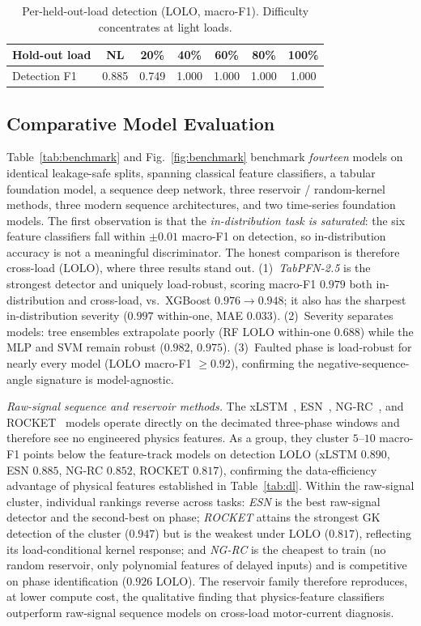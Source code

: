 \documentclass[journal]{IEEEtran}
\begin{document}
\begin{table}[!t]
\caption{Per-held-out-load detection (LOLO, macro-F1). Difficulty concentrates at light loads.}
\label{tab:perload}
\centering
\begin{tabular}{@{}lcccccc@{}}
\toprule
Hold-out load & NL & 20\% & 40\% & 60\% & 80\% & 100\% \\
\midrule
Detection F1 & 0.885 & 0.749 & 1.000 & 1.000 & 1.000 & 1.000 \\
\bottomrule
\end{tabular}
\end{table}

\subsection{Comparative Model Evaluation}
Table~\ref{tab:benchmark} and Fig.~\ref{fig:benchmark} benchmark \emph{fourteen} models on
identical leakage-safe splits, spanning classical feature classifiers, a tabular foundation
model, a sequence deep network, three reservoir / random-kernel methods, three modern
sequence architectures, and two time-series foundation models. The first observation is
that the \emph{in-distribution task is saturated}: the six feature classifiers fall within
$\pm0.01$ macro-F1 on detection, so in-distribution accuracy is not a meaningful
discriminator. The honest comparison is therefore cross-load (LOLO), where three results
stand out. (1)~\emph{TabPFN-2.5} is the strongest detector and uniquely load-robust,
scoring macro-F1 $0.979$ both in-distribution and cross-load, vs.\ XGBoost
$0.976\!\rightarrow\!0.948$; it also has the sharpest in-distribution severity ($0.997$
within-one, MAE $0.033$). (2)~Severity separates models: tree ensembles extrapolate
poorly (RF LOLO within-one $0.688$) while the MLP and SVM remain robust ($0.982$, $0.975$).
(3)~Faulted phase is load-robust for nearly every model (LOLO macro-F1 $\geq\!0.92$),
confirming the negative-sequence-angle signature is model-agnostic.

\emph{Raw-signal sequence and reservoir methods.} The xLSTM~\cite{beck2024}, ESN~\cite{jaeger2001},
NG-RC~\cite{gauthier2021}, and ROCKET~\cite{dempster2020} models operate directly on the
decimated three-phase windows and therefore see no engineered physics features. As a group,
they cluster $5$--$10$ macro-F1 points below the feature-track models on detection LOLO
(xLSTM $0.890$, ESN $0.885$, NG-RC $0.852$, ROCKET $0.817$), confirming the
data-efficiency advantage of physical features established in Table~\ref{tab:dl}. Within
the raw-signal cluster, individual rankings reverse across tasks: \emph{ESN} is the best
raw-signal detector and the second-best on phase; \emph{ROCKET} attains the strongest GK
detection of the cluster ($0.947$) but is the weakest under LOLO ($0.817$), reflecting
its load-conditional kernel response; and \emph{NG-RC} is the cheapest to train (no random
reservoir, only polynomial features of delayed inputs) and is competitive on phase
identification ($0.926$ LOLO). The reservoir family therefore reproduces, at lower compute
cost, the qualitative finding that physics-feature classifiers outperform raw-signal
sequence models on cross-load motor-current diagnosis.
\end{document}
